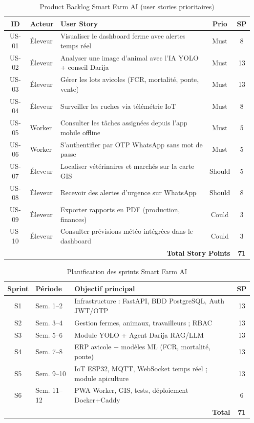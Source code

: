 \documentclass[12pt,a4paper,twoside]{report}
\begin{document}
\begin{table}[H]
\centering
\caption{Product Backlog Smart Farm AI (user stories prioritaires)}
\label{tab:product_backlog}
\begin{tabularx}{\linewidth}{clXcc}
\toprule
\textbf{ID} & \textbf{Acteur} & \textbf{User Story} & \textbf{Prio} & \textbf{SP} \\
\midrule
US-01 & Éleveur  & Visualiser le dashboard ferme avec alertes temps réel & Must & 8 \\
US-02 & Éleveur  & Analyser une image d'animal avec l'IA YOLO + conseil Darija & Must & 13 \\
US-03 & Éleveur  & Gérer les lots avicoles (FCR, mortalité, ponte, vente) & Must & 13 \\
US-04 & Éleveur  & Surveiller les ruches via télémétrie IoT & Must & 8 \\
US-05 & Worker   & Consulter les tâches assignées depuis l'app mobile offline & Must & 5 \\
US-06 & Worker   & S'authentifier par OTP WhatsApp sans mot de passe & Must & 5 \\
US-07 & Éleveur  & Localiser vétérinaires et marchés sur la carte GIS & Should & 5 \\
US-08 & Éleveur  & Recevoir des alertes d'urgence sur WhatsApp & Should & 8 \\
US-09 & Éleveur  & Exporter rapports en PDF (production, finances) & Could & 3 \\
US-10 & Éleveur  & Consulter prévisions météo intégrées dans le dashboard & Could & 3 \\
\midrule
\multicolumn{4}{r}{\textbf{Total Story Points}} & \textbf{71} \\
\bottomrule
\end{tabularx}
\end{table}

\begin{table}[H]
\centering
\caption{Planification des sprints Smart Farm AI}
\label{tab:sprints}
\begin{tabularx}{\linewidth}{clXc}
\toprule
\textbf{Sprint} & \textbf{Période} & \textbf{Objectif principal} & \textbf{SP} \\
\midrule
S1 & Sem. 1--2  & Infrastructure : FastAPI, BDD PostgreSQL, Auth JWT/OTP & 13 \\
S2 & Sem. 3--4  & Gestion fermes, animaux, travailleurs ; RBAC & 13 \\
S3 & Sem. 5--6  & Module YOLO + Agent Darija RAG/LLM & 13 \\
S4 & Sem. 7--8  & ERP avicole + modèles ML (FCR, mortalité, ponte) & 13 \\
S5 & Sem. 9--10 & IoT ESP32, MQTT, WebSocket temps réel ; module apiculture & 13 \\
S6 & Sem. 11--12& PWA Worker, GIS, tests, déploiement Docker+Caddy & 6 \\
\midrule
\multicolumn{3}{r}{\textbf{Total}} & \textbf{71} \\
\bottomrule
\end{tabularx}
\end{table}
\end{document}
